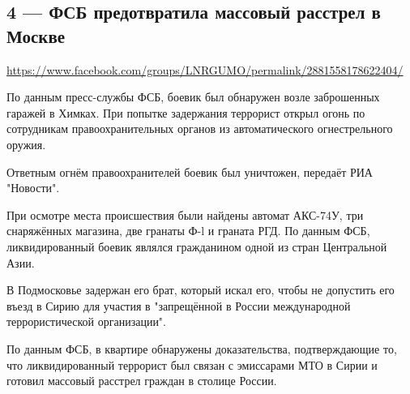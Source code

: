  
 
  
\clearpage
\subsection{4 --- ФСБ предотвратила массовый расстрел в Москве}
\url{https://www.facebook.com/groups/LNRGUMO/permalink/2881558178622404/}


По данным пресс-службы ФСБ, боевик был обнаружен возле заброшенных гаражей в
Химках.  При попытке задержания террорист открыл огонь по сотрудникам
правоохранительных органов из автоматического огнестрельного оружия.

Ответным огнём правоохранителей боевик был уничтожен, передаёт РИА "Новости".

При осмотре места происшествия были найдены автомат АКС-74У, три снаряжённых
магазина, две гранаты Ф-l и граната РГД.  По данным ФСБ, ликвидированный боевик
являлся гражданином одной из стран Центральной Азии.

В Подмосковье задержан его брат, который искал его, чтобы не допустить его
въезд в Сирию для участия в "запрещённой в России международной
террористической организации".

По данным ФСБ, в квартире обнаружены доказательства, подтверждающие то, что
ликвидированный террорист был связан с эмиссарами МТО в Сирии и готовил
массовый расстрел граждан в столице России.
  
